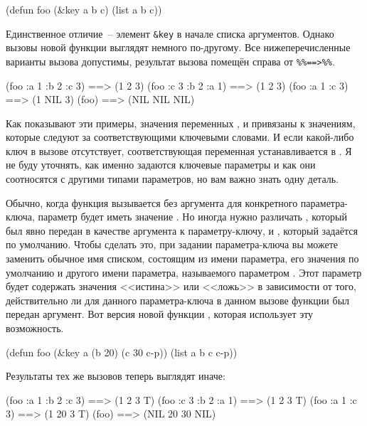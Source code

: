 \begin{myverb}
(defun foo (&key a b c) (list a b c))
\end{myverb}

Единственное отличие~-- элемент \lstinline!&key! в начале списка аргументов. Однако вызовы
новой функции  выглядят немного по-другому. Все нижеперечисленные варианты
вызова  допустимы, результат вызова помещён справа от \lstinline!%%==>%%!.

\begin{myverb}
  (foo :a 1 :b 2 :c 3)  ==> (1 2 3)
  (foo :c 3 :b 2 :a 1)  ==> (1 2 3)
  (foo :a 1 :c 3)       ==> (1 NIL 3)
  (foo)                 ==> (NIL NIL NIL)
\end{myverb}

Как показывают эти примеры, значения переменных ,  и  привязаны
к значениям, которые следуют за соответствующими ключевыми словами. И если какой-либо
ключ в вызове отсутствует, соответствующая переменная устанавливается в . Я не
буду уточнять, как именно задаются ключевые параметры и как они соотносятся с другими
типами параметров, но вам важно знать одну деталь.

Обычно, когда функция вызывается без аргумента для конкретного параметра-ключа, параметр
будет иметь значение . Но иногда нужно различать , который был явно
передан в качестве аргумента к параметру-ключу, и , который задаётся по
умолчанию. Чтобы сделать это, при задании параметра-ключа вы можете заменить обычное имя
списком, состоящим из имени параметра, его значения по умолчанию и другого имени
параметра, называемого параметром . Этот параметр  будет
содержать значения <<истина>> или <<ложь>> в зависимости от того, действительно ли для
данного параметра-ключа в данном вызове функции был передан аргумент. Вот версия новой
функции , которая использует эту возможность.

\begin{myverb}
(defun foo (&key a (b 20) (c 30 c-p)) (list a b c c-p))
\end{myverb}

Результаты тех же вызовов теперь выглядят иначе:

\begin{myverb}
  (foo :a 1 :b 2 :c 3)  ==> (1 2 3 T)
  (foo :c 3 :b 2 :a 1)  ==> (1 2 3 T)
  (foo :a 1 :c 3)       ==> (1 20 3 T)
  (foo)                 ==> (NIL 20 30 NIL)
\end{myverb}

